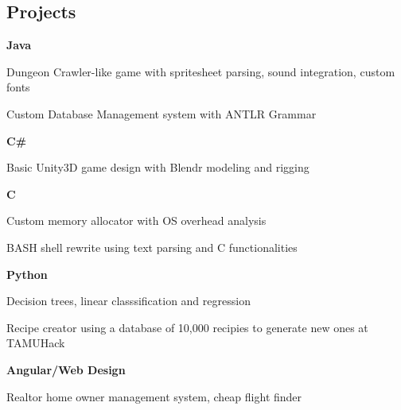 \documentclass[10pt,letterpaper]{article}
\newenvironment{indentsection}[1]%
{\begin{list}{}%
	{\setlength{\leftmargin}{#1}}%
	\item[]%
}
{\end{list}}
\newcommand{\CPP}
{C\nolinebreak[4]\hspace{-.05em}\raisebox{.22ex}{\footnotesize\bf ++}}
\begin{document}
\subsection*{Projects}
\begin{indentsection}{\parindent}
	\begin{itemize*}
	\item \textbf{Java} 
	\vspace{-0.2em}
		\begin{itemize*}
			\item Dungeon Crawler-like game with spritesheet parsing, sound integration, custom fonts 
			\item Custom Database Management system with ANTLR Grammar 
		\end{itemize*}
	\item \textbf{C\#} 
	\vspace{-0.2em}
		\begin{itemize*}
			\item Basic Unity3D game design with Blendr modeling and rigging 
		\end{itemize*}
	\item \textbf{\CPP}
	\vspace{-0.2em}
		\begin{itemize*}
			\item Custom memory allocator with OS overhead analysis
			\item BASH shell rewrite using text parsing and C functionalities 
		\end{itemize*}
	\item \textbf{Python}
	\vspace{-0.2em}
		\begin{itemize*}
			\item Decision trees, linear classsification and regression 
			\item Recipe creator using a database of 10,000 recipies to generate new ones at 				TAMUHack 
		\end{itemize*}
	\item \textbf{Angular/Web Design}
	\vspace{-0.2em}
		\begin{itemize*}
			\item Realtor home owner management system, cheap flight finder
		\end{itemize*}
	\end{itemize*}
\end{indentsection}
\end{document}
